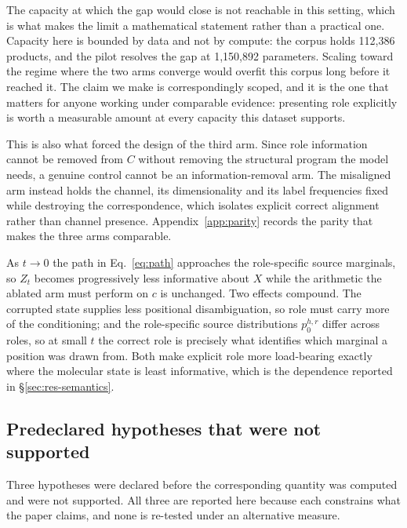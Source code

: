 \documentclass{article}
\makeatletter
\newcounter{none}
\newcommand{\CorpusSize}{112{,}386}        %
\def\paragraph{\@startsection{paragraph}{4}{\z@}{0.6ex plus 0.2ex minus .1ex}{-1em}{\normalsize\bf}}
\makeatother
\begin{document}
The capacity at which the gap would close is not reachable in this setting, which is what makes the
limit a mathematical statement rather than a practical one. Capacity here is bounded by data and not
by compute: the corpus holds \CorpusSize{} products, and the pilot
resolves the gap at 1{,}150{,}892 parameters. Scaling toward the regime where the two arms converge
would overfit this corpus long before it reached it. The claim we make is correspondingly scoped, and
it is the one that matters for anyone working under comparable evidence: presenting role explicitly
is worth a measurable amount at every capacity this dataset supports.

This is also what forced the design of the third arm. Since role information cannot be removed from
$C$ without removing the structural program the model needs, a genuine control cannot be an
information-removal arm. The misaligned arm instead holds the channel, its dimensionality and its
label frequencies fixed while destroying the correspondence, which isolates explicit correct
alignment rather than channel presence. Appendix~\ref{app:parity} records the parity that makes the
three arms comparable.

\paragraph{Why utility grows as $t \to 0$.}
As $t \to 0$ the path in Eq.~\eqref{eq:path} approaches the role-specific source marginals, so $Z_t$
becomes progressively less informative about $X$ while the arithmetic the ablated arm must perform on
$c$ is unchanged. Two effects compound. The corrupted state supplies less positional disambiguation,
so role must carry more of the conditioning; and the role-specific source distributions $p_0^{h,r}$
differ across roles, so at small $t$ the correct role is precisely what identifies which marginal a
position was drawn from. Both make explicit role more load-bearing exactly where the molecular state
is least informative, which is the dependence reported in \S\ref{sec:res-semantics}.

\subsection{Predeclared hypotheses that were not supported}
\label{app:negatives}
Three hypotheses were declared before the corresponding quantity was computed and were not
supported. All three are reported here because each constrains what the paper claims, and none is
re-tested under an alternative measure.
\end{document}
